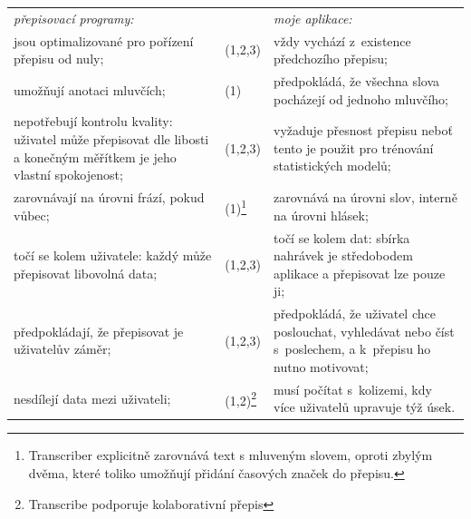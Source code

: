 \noindent
\begin{tabularx}{\textwidth}{
    @{\hspace{1.5em}}%
    >{{\hsize=0.9\hsize}\leavevmode\llap{\textbullet~}\raggedright}%
    X%
    @{\hspace{0.2em}}
    >{\hsize=0.2\hsize}
    X
    @{\quad\hspace{1.5em}}%
    >{\leavevmode\llap{\textbullet~}\raggedright\arraybackslash}%
    X%
    @{}%
  }
  \em{přepisovací programy}: & & \em{moje aplikace}: \\
  jsou optimalizované pro pořízení přepisu od nuly; &
    (1,2,3) &
      vždy vychází z~existence předchozího přepisu; \\

  umožňují anotaci mluvčích; &
    (1) &
      předpokládá, že všechna slova pocházejí od jednoho mluvčího; \\

  nepotřebují kontrolu kvality: uživatel může přepisovat dle libosti a konečným
  měřítkem je jeho vlastní spokojenost; &
    (1,2,3) &
      vyžaduje přesnost přepisu neboť tento je použit pro trénování
      statistických modelů; \\

  zarovnávají na úrovni frází, pokud vůbec; &
    (1)\footnote{
        Transcriber explicitně zarovnává text s mluveným slovem, oproti zbylým
        dvěma, které toliko umožňují přidání časových značek do přepisu.
    } &
      zarovnává na úrovni slov, interně na úrovni hlásek; \\

  točí se kolem uživatele: každý může přepisovat libovolná data; &
    (1,2,3) &
      točí se kolem dat: sbírka nahrávek je středobodem aplikace a přepisovat
      lze pouze ji; \\

  předpokládají, že přepisovat je uživatelův záměr; &
    (1,2,3) &
      předpokládá, že uživatel chce poslouchat, vyhledávat nebo číst
      s~poslechem, a k~přepisu ho nutno motivovat; \\

  nesdílejí data mezi uživateli; &
    (1,2)\footnote{Transcribe podporuje kolaborativní přepis} &
      musí počítat s~kolizemi, kdy více uživatelů upravuje týž úsek. \\
\end{tabularx}


